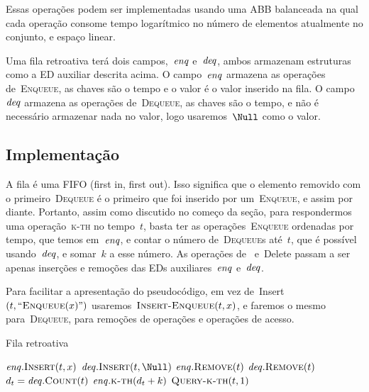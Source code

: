 \documentclass[quali.tex]{subfile}
\begin{document}
Essas operações podem ser implementadas usando uma ABB balanceada na qual cada operação consome tempo logarítmico no número de elementos atualmente no conjunto, e espaço linear.

\newcommand{\deqs}{\V{deq}}
\newcommand{\enqs}{\V{enq}}

Uma fila retroativa terá dois campos,~$\enqs$ e~$\deqs$, ambos armazenam estruturas como a ED auxiliar descrita acima. O campo~$\enqs$ armazena as operações de~\textsc{Enqueue}, as chaves são o tempo e o valor é o valor inserido na fila. O campo~$\deqs$ armazena as operações de~\textsc{Dequeue}, as chaves são o tempo, e não é necessário armazenar nada no valor, logo usaremos~$\Null$ como o valor.

\subsection{Implementação}

A fila é uma FIFO (first in, first out). Isso significa que o elemento removido com o primeiro~\textsc{Dequeue} é o primeiro que foi inserido por um~\textsc{Enqueue}, e assim por diante. Portanto, assim como discutido no começo da seção, para respondermos uma operação~\textsc{k-th} no tempo~$t$, basta ter as operações~\textsc{Enqueue} ordenadas por tempo, que temos em~$\enqs$, e contar o número de~\textsc{Dequeue}s até~$t$, que é possível usando~$\deqs$, e somar~$k$ a esse número. As operações de~ e~Delete passam a ser apenas inserções e remoções das EDs auxiliares~$\enqs$ e~$\deqs$.

Para facilitar a apresentação do pseudocódigo, em vez de~Insert$(t, ``\Call{Enqueue}{x}")$ usaremos~$\Call{Insert-Enqueue}{t, x}$, e faremos o mesmo para~\textsc{Dequeue}, para remoções de operações e operações de acesso.

\begin{algorithm}
\caption{Fila retroativa} \label{lst:filaretro}
\begin{algorithmic}[1]
		\State $\enqs.\Call{Insert}{t, x}$
	\EndFunction
		\State $\deqs.\Call{Insert}{t, \Null}$
	\EndFunction
		\State $\enqs.\Call{Remove}{t}$
	\EndFunction
		\State $\deqs.\Call{Remove}{t}$
	\EndFunction
		\State $d_t = \deqs.\Call{Count}{t}$ 
		\State \Return $\enqs.\Call{k-th}{d_t + k}$
	\EndFunction
		\State \Return $\Call{Query-k-th}{t, 1}$
	\EndFunction
\end{algorithmic}
\end{algorithm}
\end{document}

